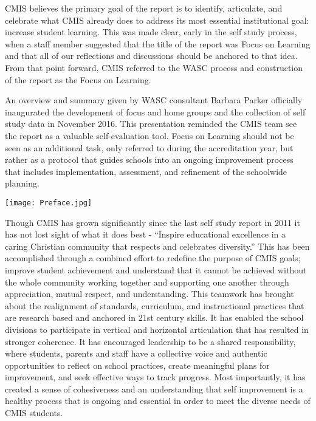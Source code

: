 CMIS believes the primary goal of the report is to identify, articulate, and celebrate what CMIS already does to address its most essential institutional goal: increase student learning. This was made clear, early in the self study process, when a staff member suggested that the title of the report was Focus on Learning and that all of our reflections and discussions should be anchored to that idea. From that point forward, CMIS referred to the WASC process and construction of the report as the Focus on Learning. 

An overview and summary given by WASC consultant Barbara Parker officially inaugurated the development of focus and home groups and the collection of self study data in November 2016. This presentation reminded the CMIS team see the report as a valuable self-evaluation tool. Focus on Learning should not be seen as an additional task, only referred to during the accreditation year, but rather as a protocol that guides schools into an ongoing improvement process that includes implementation, assessment, and refinement of the schoolwide planning.

{\centering\texttt{[image: Preface.jpg]}}

Though CMIS has grown significantly since the last self study report in 2011 it has not lost sight of what it does best - “Inspire educational excellence in a caring Christian community that respects and celebrates diversity.” This has been accomplished through a combined effort to redefine the purpose of CMIS goals; improve student achievement and understand that it cannot be achieved without the whole community working together and supporting one another through appreciation, mutual respect, and understanding. This teamwork has brought about the realignment of standards, curriculum, and instructional practices that are research based and anchored in 21st century skills. It has enabled the school divisions to participate in vertical and horizontal articulation that has resulted in stronger coherence. It has encouraged leadership to be a shared responsibility, where students, parents and staff have a collective voice and authentic opportunities to reflect on school practices, create meaningful plans for improvement, and seek effective ways to track progress. Most importantly, it has created a sense of cohesiveness and an understanding that self improvement is a healthy process that is ongoing and essential in order to meet the diverse needs of CMIS students.



